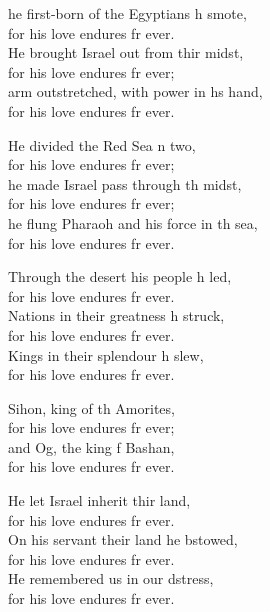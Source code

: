 \settowidth{\versewidth}{he flung Pharaoh and his force in the sea, *}
\begin{psalmverse}%
  \begin{patverse}
he first-born of the Egyptians h smote,\Med\\
    for his love endures fr ever.\\
He brought Israel out from thir midst,\Med\\
    for his love endures fr ever;\\
arm outstretched, with power in h\pointup{\i}s hand,\Med\\
    for his love endures fr ever.

He divided the Red Sea \pointup{\i}n two,\Med\\
    for his love endures fr ever;\\
he made Israel pass through th midst,\Med\\
    for his love endures fr ever;\\
he flung Pharaoh and his force in th sea,\Med\\
    for his love endures fr ever.

Through the desert his people h led,\Med\\
    for his love endures fr ever.\\
Nations in their greatness h struck,\Med\\
    for his love endures fr ever.\\
Kings in their splendour h slew,\Med\\
    for his love endures fr ever.

Sihon, king of th Amorites,\Med\\
    for his love endures fr ever;\\
and Og, the king f Bashan,\Med\\
    for his love endures fr ever.

He let Israel inherit thir land,\Med\\
    for his love endures fr ever.\\
On his servant their land he bstowed,\Med\\
    for his love endures fr ever.\\
He remembered us in our d\pointup{\i}stress,\Med\\
    for his love endures fr ever.


\end{patverse}
\end{psalmverse}
